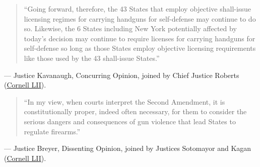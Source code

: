 \documentclass[12pt]{article}
\begin{document}
\begin{quote}
``Going forward, therefore, the 43 States that employ objective shall-issue licensing regimes for carrying handguns for self-defense may continue to do so. Likewise, the 6 States including New York potentially affected by today's decision may continue to require licenses for carrying handguns for self-defense so long as those States employ objective licensing requirements like those used by the 43 shall-issue States.''
\end{quote}
\noindent --- Justice Kavanaugh, Concurring Opinion, joined by Chief Justice Roberts (\href{https://www.law.cornell.edu/supremecourt/text/20-843}{Cornell LII}).

\begin{quote}
``In my view, when courts interpret the Second Amendment, it is constitutionally proper, indeed often necessary, for them to consider the serious dangers and consequences of gun violence that lead States to regulate firearms.''
\end{quote}
\noindent --- Justice Breyer, Dissenting Opinion, joined by Justices Sotomayor and Kagan (\href{https://www.law.cornell.edu/supremecourt/text/20-843}{Cornell LII}).
\end{document}
